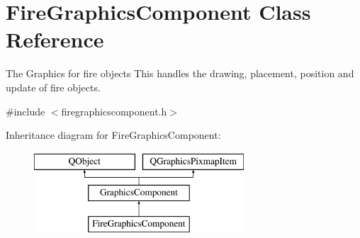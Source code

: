 \hypertarget{classFireGraphicsComponent}{\section{Fire\-Graphics\-Component Class Reference}
\label{classFireGraphicsComponent}
}


The Graphics for fire objects This handles the drawing, placement, position and update of fire objects.  




{\ttfamily \#include $<$firegraphicscomponent.\-h$>$}

Inheritance diagram for Fire\-Graphics\-Component\-:\begin{figure}[H]
\begin{center}
\leavevmode
\includegraphics[height=3.000000cm]{classFireGraphicsComponent}
\end{center}
\end{figure}

